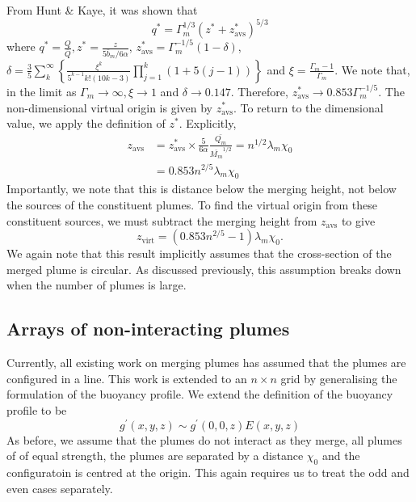 \documentclass{jfm}
\begin{document}
	From Hunt \& Kaye, it was shown that 
	\begin{equation}
			q^* = \Gamma_m^{1/3}(z^* + z_{\text{avs}}^*)^{5/3}
	\end{equation}
	where $q^* = \tfrac{Q}{\bar{Q}}, z^* = \tfrac{z}{5 \bar{b}_m/6\alpha}$, $z^*_{\text{avs}} = \Gamma_m^{-1/5}(1-\delta)$, $\displaystyle{\delta = \frac{3}{5}\sum_k^{\infty}\left\{\frac{\xi^k}{5^{k-1}k!(10k-3)}\prod_{j=1}^k (1 + 5(j-1))\right\}}$ and $\xi = \tfrac{\Gamma_m - 1}{\Gamma_m}$. We note that, in the limit as $\Gamma_m \rightarrow \infty, \xi \rightarrow 1$ and $\delta \rightarrow 0.147$. Therefore, $z^*_{\text{avs}} \rightarrow 0.853 \Gamma_m^{-1/5}$. The non-dimensional virtual origin is given by $z^*_{\text{avs}}$. To return to the dimensional value, we apply the definition of $z^*$. Explicitly, 
	\begin{align*}
		z_{\text{avs}} &= z^*_{\text{avs}} \times \frac{5}{6\alpha}\frac{\bar{Q_m}}{\bar{M_m}^{1/2}} = n^{1/2}\lambda_m\chi_0 \\
		&= 0.853 n^{2/5}\lambda_m\chi_0
	\end{align*}
	Importantly, we note that this is distance below the merging height, not below the sources of the constituent plumes. To find the virtual origin from these constituent sources, we must subtract the merging height from $z_{\text{avs}}$ to give
	\begin{equation}
			z_{\text{virt}} = (0.853n^{2/5} - 1)\lambda_m\chi_0.
	\end{equation}
	We again note that this result implicitly assumes that the cross-section of the merged plume is circular. As discussed previously, this assumption breaks down when the number of plumes is large.
	\subsection{Arrays of non-interacting plumes}
	Currently, all existing work on merging plumes has assumed that the plumes are configured in a line. This work is extended to an $n \times n$ grid by generalising the formulation of the buoyancy profile. We extend the definition of the buoyancy profile to be
	\begin{equation}
	g^{\prime}(x,y,z)\sim g^{\prime}(0,0,z)E(x,y,z)
	\end{equation}
	 As before, we assume that the plumes do not interact as they merge, all plumes of of equal strength, the plumes are separated by a distance $\chi_0$ and the configuratoin is centred at the origin. This again requires us to treat the odd and even cases separately.
	
\end{document}
